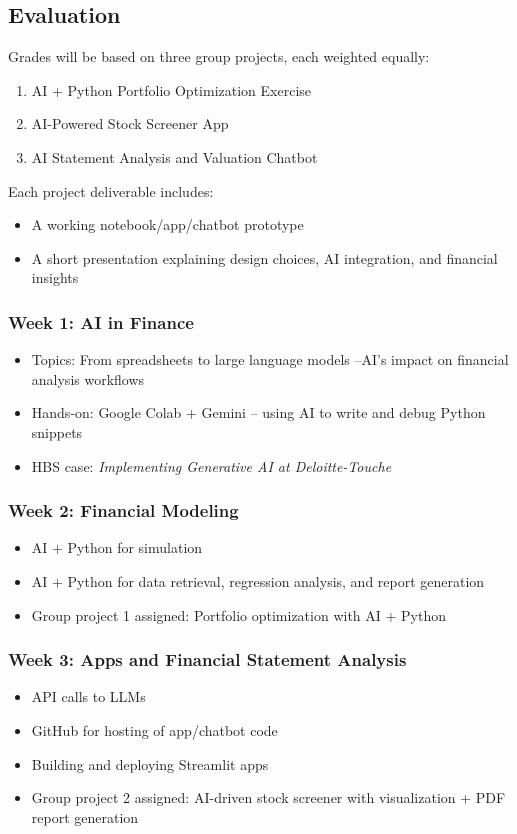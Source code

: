 \documentclass[11pt]{article}
\begin{document}
\subsection*{Evaluation}

Grades will be based on three group projects, each weighted equally:
\begin{enumerate}\setlength{\itemsep}{0pt}
\item AI + Python Portfolio Optimization Exercise 
\item AI-Powered Stock Screener App 
\item AI Statement Analysis and Valuation Chatbot 
\end{enumerate}
Each project deliverable includes:
\begin{itemize}\setlength{\itemsep}{0pt}
\item A working notebook/app/chatbot prototype
\item A short presentation explaining design choices, AI integration, and financial insights
\end{itemize}

\subsubsection*{Week 1: AI in Finance}
\begin{itemize}\setlength{\itemsep}{0pt}
\item Topics: From spreadsheets to large language models --AI's impact on financial analysis workflows
\item Hands-on: Google Colab + Gemini -- using AI to write and debug Python snippets
\item HBS case: \textit{Implementing Generative AI at Deloitte-Touche}
\end{itemize}

\subsubsection*{Week 2: Financial Modeling}
\begin{itemize}\setlength{\itemsep}{0pt}
\item AI + Python for simulation
\item AI + Python for data retrieval, regression analysis, and report generation
\item Group project 1 assigned: Portfolio optimization with AI + Python
\end{itemize}

\subsubsection*{Week 3: Apps and Financial Statement Analysis}
\begin{itemize}\setlength{\itemsep}{0pt}
\item API calls to LLMs
\item GitHub for hosting of app/chatbot code
\item Building and deploying Streamlit apps
\item Group project 2 assigned: AI-driven stock screener with visualization + PDF report generation
\end{itemize}
\end{document}
